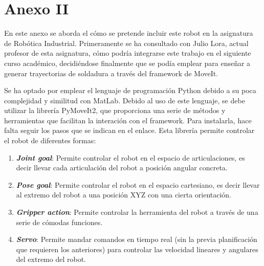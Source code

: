 \chapter*{Anexo II}
\label{cap:anexoii}

\noindent En este anexo se aborda el cómo se pretende incluir este robot en la asignatura de Robótica Industrial. Primeramente 
se ha consultado con Julio Lora, actual profesor de esta asignatura, cómo podría integrarse este trabajo en el siguiente curso académico, decidiéndose 
finalmente que se podía emplear para enseñar a generar trayectorias de soldadura a través del framework de MoveIt. 
  
   
Se ha optado por emplear el lenguaje de programación Python debido a su poca complejidad y similitud con MatLab. Debido al uso de 
este lenguaje, se debe utilizar la librería PyMoveIt2, que proporciona una serie de métodos y herramientas que 
facilitan la interación con el framework. Para instalarla, hace falta seguir los pasos que se indican en el enlace. Esta librería permite controlar 
el robot de diferentes formas:
\begin{enumerate}
\item \textbf{\textit{Joint goal}}: Permite controlar el robot en el espacio de articulaciones, es decir llevar cada articulación del robot a posición angular concreta.
\item \textbf{\textit{Pose goal}}: Permite controlar el robot en el espacio cartesiano, es decir llevar al extremo del robot a una posición XYZ con una 
cierta orientación.
\item \textbf{\textit{Gripper action}}: Permite controlar la herramienta del robot a través de una serie de cómodas funciones.
\item \textbf{\textit{Servo}}: Permite mandar comandos en tiempo real (sin la previa planificación que requieren los anteriores) para controlar las velocidad lineares y 
angulares del extremo del robot.

\end{enumerate}

